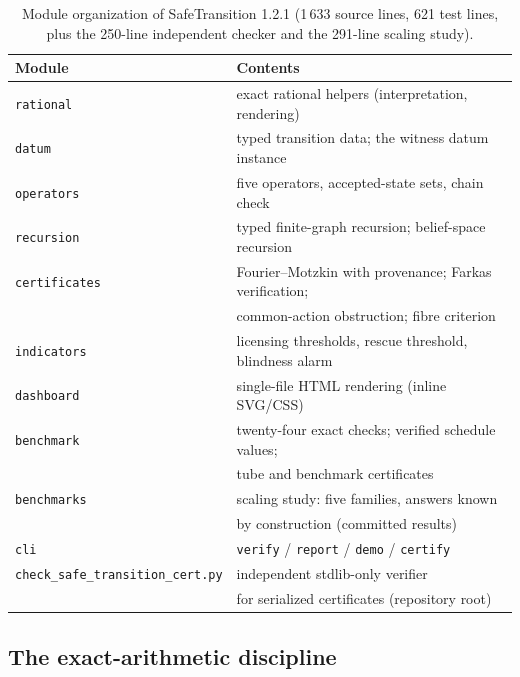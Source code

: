 \documentclass[3p,11pt]{elsarticle}
\begin{document}
\begin{table}[t]
\centering
\small
\begin{tabular}{@{}ll@{}}
\toprule
Module & Contents \\
\midrule
\texttt{rational} & exact rational helpers (interpretation, rendering) \\
\texttt{datum} & typed transition data; the witness datum instance \\
\texttt{operators} & five operators, accepted-state sets, chain check \\
\texttt{recursion} & typed finite-graph recursion; belief-space recursion \\
\texttt{certificates} & Fourier--Motzkin with provenance; Farkas verification; \\
                       & common-action obstruction; fibre criterion \\
\texttt{indicators} & licensing thresholds, rescue threshold, blindness alarm \\
\texttt{dashboard} & single-file HTML rendering (inline SVG/CSS) \\
\texttt{benchmark} & twenty-four exact checks; verified schedule values; \\
                       & tube and benchmark certificates \\
\texttt{benchmarks} & scaling study: five families, answers known \\
                       & by construction (committed results) \\
\texttt{cli} & \texttt{verify} / \texttt{report} / \texttt{demo} / \texttt{certify} \\
\texttt{check\_safe\_transition\_cert.py} & independent stdlib-only verifier \\
                       & for serialized certificates (repository root) \\
\bottomrule
\end{tabular}
\caption{Module organization of SafeTransition 1.2.1
(1\,633 source lines, 621 test lines, plus the 250-line independent
checker and the 291-line scaling study).}
\label{tab:modules}
\end{table}

\subsection{The exact-arithmetic discipline}\label{sec:exactness}
\end{document}
